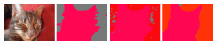 
\begin{figure}[tbh!]
  \centering
    
  \hspace{4em}
  \hspace{1.5em}
  \hspace{1.5em}
  \vspace{-0.05em}
  \vspace{-0.05em}
  {\includegraphics[width=0.24\textwidth]{figures/experiments/context/image/0016.jpg}}
  {\includegraphics[width=0.24\textwidth]{figures/experiments/context/orgckpt/0016.png}}
  {\includegraphics[width=0.24\textwidth]{figures/experiments/context/nonnoisy/0016.png}}
  {\includegraphics[width=0.24\textwidth]{figures/experiments/context/gt/2008_000056.png}}
    

\end{figure}
